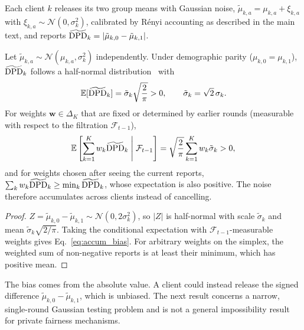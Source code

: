 Each client $k$ releases its two group means with Gaussian noise, $\tilde{\mu}_{k,a} = \mu_{k,a} + \xi_{k,a}$ with $\xi_{k,a} \sim \mathcal{N}(0, \sigma_k^2)$, calibrated by R\'enyi accounting as described in the main text, and reports $\widetilde{\mathrm{DPD}}_k = |\tilde{\mu}_{k,0} - \tilde{\mu}_{k,1}|$.

\begin{lemma}
\label{lem:folded_normal}
Let $\tilde{\mu}_{k,a} \sim \mathcal{N}(\mu_{k,a}, \sigma_k^2)$ independently. Under demographic parity ($\mu_{k,0} = \mu_{k,1}$), $\widetilde{\mathrm{DPD}}_k$ follows a half-normal distribution~\citep{leone1961folded} with
\begin{equation}
\label{eq:folded_exp}
\mathbb{E}[\widetilde{\mathrm{DPD}}_k] = \tilde{\sigma}_k \sqrt{\frac{2}{\pi}} > 0, \qquad \tilde{\sigma}_k = \sqrt{2}\,\sigma_k .
\end{equation}
For weights $\bm{w} \in \Delta_K$ that are fixed or determined by earlier rounds (measurable with respect to the filtration $\mathcal{F}_{t-1}$),
\begin{equation}
\label{eq:accum_bias}
\mathbb{E}\left[ \sum_{k=1}^K w_k \widetilde{\mathrm{DPD}}_k \;\middle|\; \mathcal{F}_{t-1} \right] = \sqrt{\frac{2}{\pi}} \sum_{k=1}^K w_k \tilde{\sigma}_k > 0,
\end{equation}
and for weights chosen after seeing the current reports, $\sum_k w_k \widetilde{\mathrm{DPD}}_k \ge \min_k \widetilde{\mathrm{DPD}}_k$, whose expectation is also positive. The noise therefore accumulates across clients instead of cancelling.
\end{lemma}
\begin{proof}
$Z = \tilde{\mu}_{k,0} - \tilde{\mu}_{k,1} \sim \mathcal{N}(0, 2\sigma_k^2)$, so $|Z|$ is half-normal with scale $\tilde{\sigma}_k$ and mean $\tilde{\sigma}_k\sqrt{2/\pi}$. Taking the conditional expectation with $\mathcal{F}_{t-1}$-measurable weights gives Eq.~\eqref{eq:accum_bias}. For arbitrary weights on the simplex, the weighted sum of non-negative reports is at least their minimum, which has positive mean.
\end{proof}

The bias comes from the absolute value. A client could instead release the signed difference $\tilde{\mu}_{k,0} - \tilde{\mu}_{k,1}$, which is unbiased. The next result concerns a narrow, single-round Gaussian testing problem and is not a general impossibility result for private fairness mechanisms.

